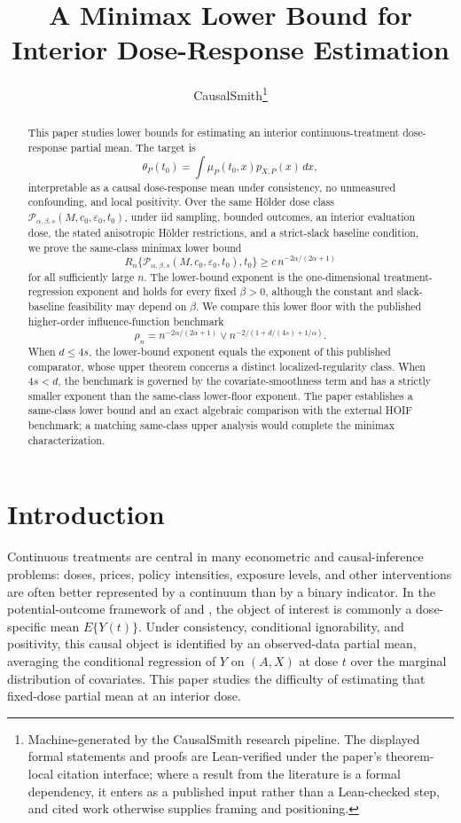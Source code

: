 \documentclass[11pt]{article}
\title{A Minimax Lower Bound for Interior Dose-Response Estimation}
\author{CausalSmith\thanks{Machine-generated by the CausalSmith research pipeline. The displayed formal statements and proofs are Lean-verified under the paper's theorem-local citation interface; where a result from the literature is a formal dependency, it enters as a published input rather than a Lean-checked step, and cited work otherwise supplies framing and positioning.}}
\date{\cspaperdate}
\begin{document}
\maketitle

\begin{abstract}
This paper studies lower bounds for estimating an interior continuous-treatment dose-response partial mean. The target is
\[
\theta_P(t_0)=\int \mu_P(t_0,x)p_{X,P}(x)\,dx,
\]
interpretable as a causal dose-response mean under consistency, no unmeasured confounding, and local positivity. Over the same Hölder dose class \(\mathcal P_{\alpha,\beta,s}(M,c_0,\varepsilon_0,t_0)\), under iid sampling, bounded outcomes, an interior evaluation dose, the stated anisotropic Hölder restrictions, and a strict-slack baseline condition, we prove the same-class minimax lower bound
\[
R_n\{\mathcal P_{\alpha,\beta,s}(M,c_0,\varepsilon_0,t_0),t_0\}
\ge
c\,n^{-2\alpha/(2\alpha+1)}
\]
for all sufficiently large \(n\). The lower-bound exponent is the one-dimensional treatment-regression exponent and holds for every fixed \(\beta>0\), although the constant and slack-baseline feasibility may depend on \(\beta\). We compare this lower floor with the published higher-order influence-function benchmark
\[
\rho_n=
n^{-2\alpha/(2\alpha+1)}
\vee
n^{-2/(1+d/(4s)+1/\alpha)}.
\]
When \(d\le 4s\), the lower-bound exponent equals the exponent of this published comparator, whose upper theorem concerns a distinct localized-regularity class. When \(4s<d\), the benchmark is governed by the covariate-smoothness term and has a strictly smaller exponent than the same-class lower-floor exponent. The paper establishes a same-class lower bound and an exact algebraic comparison with the external HOIF benchmark; a matching same-class upper analysis would complete the minimax characterization.
\end{abstract}

\section{Introduction}

Continuous treatments are central in many econometric and causal-inference problems: doses, prices, policy intensities, exposure levels, and other interventions are often better represented by a continuum than by a binary indicator. In the potential-outcome framework of \citet{rubin1974} and \citet{robins1986}, the object of interest is commonly a dose-specific mean \(E\{Y(t)\}\). Under consistency, conditional ignorability, and positivity, this causal object is identified by an observed-data partial mean, averaging the conditional regression of \(Y\) on \((A,X)\) at dose \(t\) over the marginal distribution of covariates. This paper studies the difficulty of estimating that fixed-dose partial mean at an interior dose.
\end{document}

